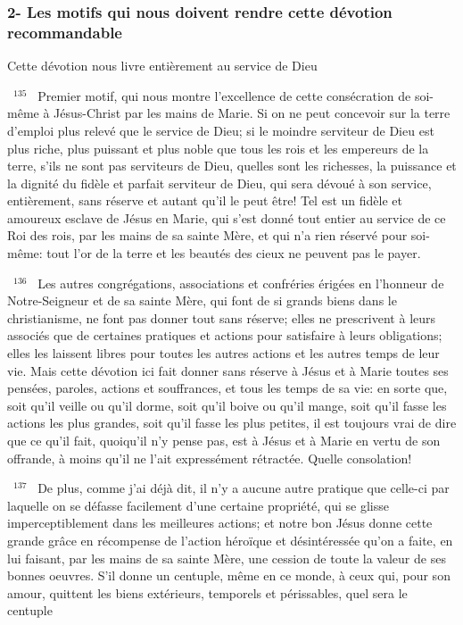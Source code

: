\documentclass[paper=a5,pagesize=pdftex,fontsize=15pt,headinclude=on,twoside=off]{scrbook}
\newcommand{\negphantom}[1]{\settowidth{\dimen0}{#1}\hspace*{-\dimen0}}
\newcommand{\versenb}[1]{\par \vspace{10pt}~\negphantom{~${}^{#1}$~}${}^{#1}$~}
\begin{document}
\subsubsection{2- Les motifs qui nous doivent rendre cette dévotion recommandable}
Cette dévotion nous livre entièrement au service de Dieu
\versenb{135} Premier motif, qui nous montre l'excellence de cette consécration de soi-même à Jésus-Christ par les mains
de Marie.
Si on ne peut concevoir sur la terre d'emploi plus relevé que le service de Dieu; si le moindre serviteur de Dieu est
plus riche, plus puissant et plus noble que tous les rois et les empereurs de la terre, s'ils ne sont pas serviteurs de
Dieu, quelles sont les richesses, la puissance et la dignité du fidèle et parfait serviteur de Dieu, qui sera dévoué à
son service, entièrement, sans réserve et autant qu'il le peut être! Tel est un fidèle et amoureux esclave de Jésus
en Marie, qui s'est donné tout entier au service de ce Roi des rois, par les mains de sa sainte Mère, et qui n'a rien
réservé pour soi-même: tout l'or de la terre et les beautés des cieux ne peuvent pas le payer.
\versenb{136} Les autres congrégations, associations et confréries érigées en l'honneur de Notre-Seigneur et de sa sainte
Mère, qui font de si grands biens dans le christianisme, ne font pas donner tout sans réserve; elles ne prescrivent
à leurs associés que de certaines pratiques et actions pour satisfaire à leurs obligations; elles les laissent libres
pour toutes les autres actions et les autres temps de leur vie. Mais cette dévotion ici fait donner sans réserve à
Jésus et à Marie toutes ses pensées, paroles, actions et souffrances, et tous les temps de sa vie: en sorte que,
soit qu'il veille ou qu'il dorme, soit qu'il boive ou qu'il mange, soit qu'il fasse les actions les plus grandes, soit qu'il
fasse les plus petites, il est toujours vrai de dire que ce qu'il fait, quoiqu'il n'y pense pas, est à Jésus et à Marie en
vertu de son offrande, à moins qu'il ne l'ait expressément rétractée. Quelle consolation!
\versenb{137} De plus, comme j'ai déjà dit, il n'y a aucune autre pratique que celle-ci par laquelle on se défasse facilement
d'une certaine propriété, qui se glisse imperceptiblement dans les meilleures actions; et notre bon Jésus donne
cette grande grâce en récompense de l'action héroïque et désintéressée qu'on a faite, en lui faisant, par les mains
de sa sainte Mère, une cession de toute la valeur de ses bonnes oeuvres. S'il donne un centuple, même en ce
monde, à ceux qui, pour son amour, quittent les biens extérieurs, temporels et périssables, quel sera le centuple
\end{document}
